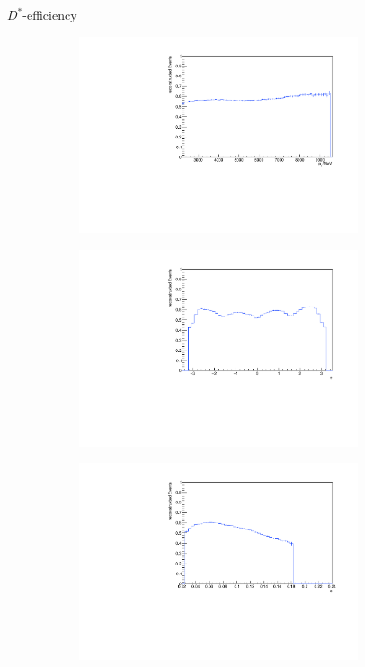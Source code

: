 \documentclass[11pt]{beamer}
\begin{document}
\begin{frame}{$D^*$-efficiency}
\begin{figure}
\begin{subfigure}{0.45\textwidth}
\includegraphics[width=0.9\textwidth]{up_pdf/single/neg/h_pt_reco_Dst_neg.pdf}
\end{subfigure}
\begin{subfigure}{0.45\textwidth}
\includegraphics[width=0.9\textwidth]{up_pdf/single/neg/h_phi_reco_Dst_neg.pdf}
\end{subfigure}
\begin{subfigure}{0.45\textwidth}
\includegraphics[width=0.9\textwidth]{up_pdf/single/neg/h_theta_reco_Dst_neg.pdf}

\end{subfigure}
\end{figure}
\end{frame}
\end{document}
